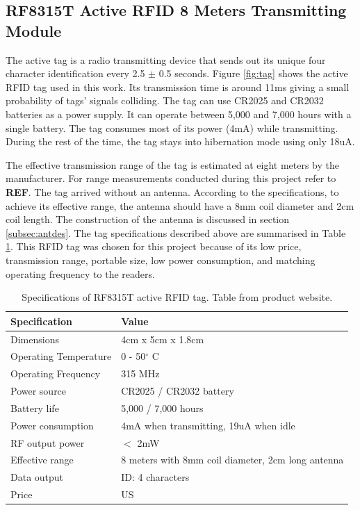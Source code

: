 \subsection{RF8315T Active RFID 8 Meters Transmitting Module}

The active tag is a radio transmitting device that sends out its unique four character identification every 2.5 $\pm$ 0.5 seconds. Figure \ref{fig:tag} shows the active RFID tag used in this work. Its transmission time is around 11ms giving a small probability of tags' signals colliding. The tag can use CR2025 and CR2032 batteries as a power supply. It can operate between 5,000 and 7,000 hours with a single battery. The tag consumes most of its power (4mA) while transmitting. During the rest of the time, the tag stays into hibernation mode using only 18uA.

The effective transmission range of the tag is estimated at eight meters by the manufacturer. For range measurements conducted during this project refer to \textbf{REF}. The tag arrived without an antenna. According to the specifications, to achieve its effective range, the antenna should have a 8mm coil diameter and 2cm coil length. The construction of the antenna is discussed in section \ref{subsec:antdes}. The tag specifications described above are summarised in Table \ref{tbl:tag}. This RFID tag was chosen for this project because of its low price, transmission range, portable size, low power consumption, and matching operating frequency to the readers.

\begin{table}[h]
	\centering
	\begin{tabular}{ | m{4cm} || m{7cm} | }
		\hline
		\textbf{Specification}	& \textbf{Value} \\ \hline
		Dimensions				& 4cm x 5cm x 1.8cm \\ \hline
		Operating Temperature	& 0 - 50$^\circ$ C	\\ \hline
		Operating Frequency		& 315 MHz	\\ \hline
		Power source			& CR2025 / CR2032 battery \\ \hline
		Battery life			& 5,000 / 7,000 hours \\ \hline
		Power consumption		& 4mA when transmitting, 19uA when idle \\ \hline
		RF output power			& $<$ 2mW \\ \hline
		Effective range			& 8 meters with 8mm coil diameter, 2cm long antenna \\ \hline
		Data output				& ID: 4 characters \\ \hline
		Price					& US \textdollar 19.95 \\ \hline
	\end{tabular}
	\caption{Specifications of RF8315T active RFID tag. Table from product website\protect\footnotemark.}
	\label{tbl:tag}
\end{table}


